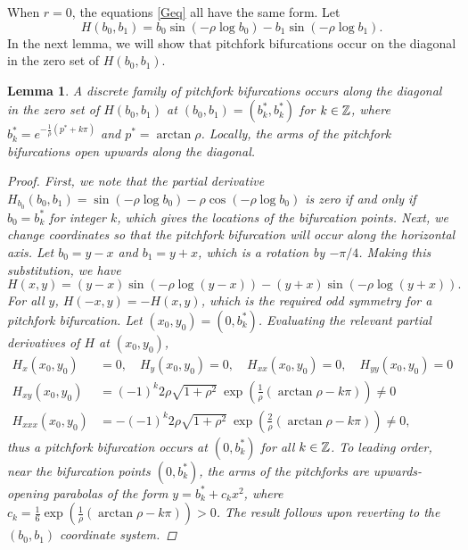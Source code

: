 \documentclass[12pt]{elsarticle}
\theoremstyle{plain}
\newtheorem{lemma}[theorem]{Lemma}
\theoremstyle{definition}
\theoremstyle{remark}
\numberwithin{theorem}{section}
\numberwithin{equation}{section}
\begin{document}
When $r = 0$, the equations \cref{Geq} all have the same form. Let
\begin{equation}\label{defH}
H(b_0, b_1) = b_0 \sin \left( -\rho \log b_0 \right) - b_1 \sin \left( -\rho \log b_1 \right).
\end{equation}
In the next lemma, we will show that pitchfork bifurcations occur on the diagonal in the zero set of $H(b_0, b_1)$.

\begin{lemma}\label{pitchforkH}
A discrete family of pitchfork bifurcations occurs along the diagonal in the zero set of $H(b_0, b_1)$ at $(b_0, b_1) = (b_k^*, b_k^*)$ for $k \in \mathbb{Z}$, where $b^*_k = e^{-\frac{1}{\rho} (p^* + k \pi) }$ and $p^* = \arctan \rho$. Locally, the arms of the pitchfork bifurcations open upwards along the diagonal.
\begin{proof}
First, we note that the partial derivative
$H_{b_0}(b_0, b_1) = \sin \left( - \rho \log b_0 \right) - \rho \cos \left( - \rho \log b_0 \right)$
is zero if and only if $b_0 = b_k^*$ for integer $k$, which gives the locations of the bifurcation points. Next, we change coordinates so that the pitchfork bifurcation will occur along the horizontal axis. Let $b_0 = y-x$ and $b_1 = y+x$, which is a rotation by $-\pi/4$. Making this substitution, we have
\begin{equation}\label{Hxy}
H(x, y) = 
(y - x) \sin \left( -\rho \log(y - x) \right) - (y + x) \sin \left( - \rho \log (y + x) \right).
\end{equation}
For all $y$, $H(-x, y) = -H(x, y)$, which is the required odd symmetry for a pitchfork bifurcation. Let $(x_0, y_0) = \left(0, b^*_k \right)$. Evaluating the relevant partial derivatives of $H$ at $(x_0, y_0)$,
\begin{align*}
H_x(x_0, y_0) &= 0, \quad H_y(x_0, y_0) = 0, \quad H_{xx}(x_0, y_0) = 0, \quad H_{yy}(x_0, y_0) = 0 \\
H_{xy}(x_0, y_0) &= (-1)^k 2 \rho \sqrt{1 + \rho^2} \: \exp{\left(\frac{1}{\rho} (\arctan \rho - k \pi) \right)} \neq 0 \\
H_{xxx}(x_0, y_0)
&= -(-1)^k 2 \rho \sqrt{1 + \rho^2} \: \exp{\left(\frac{2}{\rho} (\arctan \rho - k \pi) \right)} \neq 0,
\end{align*}
thus a pitchfork bifurcation occurs at $(0, b^*_k)$ for all $k \in \mathbb{Z}$. To leading order, near the bifurcation points $(0, b_k^*)$, the arms of the pitchforks are upwards-opening parabolas of the form $y = b_k^* + c_k x^2$, where $c_k = \frac{1}{6}\exp{\left(\frac{1}{\rho} (\arctan \rho - k \pi) \right)} > 0
$. The result follows upon reverting to the $(b_0, b_1)$ coordinate system.
\end{proof}
\end{lemma}
\end{document}
